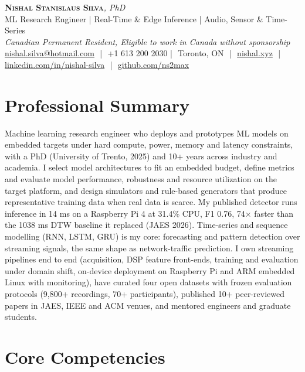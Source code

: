 \documentclass[11pt]{article}
\makeatletter
\newcommand{\cvName}{Nishal Stanislaus Silva}
\newcommand{\cvEmail}{nishal.silva@hotmail.com}
\newcommand{\cvPhone}{+1 613 200 2030}
\newcommand{\cvCity}{Toronto, ON}
\newcommand{\cvSite}{https://nishal.xyz}
\newcommand{\cvLinkedIn}{https://www.linkedin.com/in/nishal-silva}
\newcommand{\cvGitHub}{https://github.com/ns2max}
\newcommand{\cvStatus}{Canadian Permanent Resident, Eligible to work in Canada without sponsorship}
\newcommand{\cvTagline}{ML Research Engineer | Real-Time \& Edge Inference | Audio, Sensor \& Time-Series}
\makeatother
\begin{document}
\pagestyle{empty}
\begin{center}
    {\LARGE \scshape \textbf{\cvName}}{\large \textit{, PhD}}\\[1pt]
    {\small \cvTagline}\\[1pt]
    {\footnotesize\textit{\cvStatus}}\\[1pt]
    {\small
    \href{mailto:\cvEmail}{\cvEmail} \,\,|\,\, \cvPhone \,\,|\,\, \cvCity
    \,\,|\,\, \href{\cvSite}{nishal.xyz} \,\,|\,\, \href{\cvLinkedIn}{linkedin.com/in/nishal-silva}
    \,\,|\,\, \href{\cvGitHub}{github.com/ns2max}}
\end{center}

\section*{Professional Summary}

Machine learning research engineer who deploys and prototypes ML models on embedded targets under hard compute, power, memory and latency constraints, with a PhD (University of Trento, 2025) and 10+ years across industry and academia. I select model architectures to fit an embedded budget, define metrics and evaluate model performance, robustness and resource utilization on the target platform, and design simulators and rule-based generators that produce representative training data when real data is scarce. My published detector runs inference in 14 ms on a Raspberry Pi 4 at 31.4\% CPU, F1 0.76, 74$\times$ faster than the 1038 ms DTW baseline it replaced (JAES 2026). Time-series and sequence modelling (RNN, LSTM, GRU) is my core: forecasting and pattern detection over streaming signals, the same shape as network-traffic prediction. I own streaming pipelines end to end (acquisition, DSP feature front-ends, training and evaluation under domain shift, on-device deployment on Raspberry Pi and ARM embedded Linux with monitoring), have curated four open datasets with frozen evaluation protocols (9,800+ recordings, 70+ participants), published 10+ peer-reviewed papers in JAES, IEEE and ACM venues, and mentored engineers and graduate students.

\section*{Core Competencies}
\end{document}
